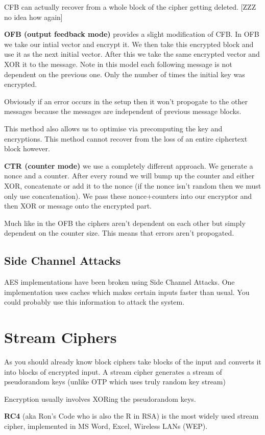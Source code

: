 \documentclass{report}
\begin{document}
CFB can actually recover from a whole block of the cipher getting deleted.
[ZZZ no idea how again]

\textbf{OFB (output feedback mode)} provides a slight modification of CFB\@.
In OFB we take
our intial vector and encrypt it. We then take this encrypted block and use it
as the next initial vector. After this we take the same encrypted vector and XOR
it to the message. Note in this model each following message is not
dependent on the previous one. Only the number of times the initial key was
encrypted.

Obviously if an error occurs in the setup then it won't propogate to the other
messages because the messages are independent of previous message blocks.

This method also allows us to optimise via precomputing the key and encryptions.
This method cannot recover from the loss of an entire ciphertext block however.

\textbf{CTR (counter mode)} we use a completely different approach.
We generate a nonce
and a counter. After every round we will bump up the counter and either XOR,
concatenate or add it to the nonce (if the nonce isn't random then we must only
use concatenation). We pass these nonce+counters into our encryptor and then
XOR or message onto the encrypted part.

Much like in the OFB the ciphers aren't dependent on each other but simply
dependent on the counter size. This means that errors aren't propogated.

\subsection{Side Channel Attacks}
AES implementations have been broken using Side Channel Attacks.
One implementation uses caches which makes certain inputs faster than usual.
You could probably use this information to attack the system.

\section{Stream Ciphers}
As you should already know block ciphers take blocks of the input and converts
it into blocks of encrypted input.
A stream cipher generates a stream of pseudorandom keys (unlike OTP which uses
truly random key stream)

Encryption usually involves XORing the pseudorandom keys.

\textbf{RC4} (aka Ron's Code who is also the R in RSA) is the most widely used
stream cipher, implemented in MS Word, Excel, Wireless LANs (WEP).
\end{document}
